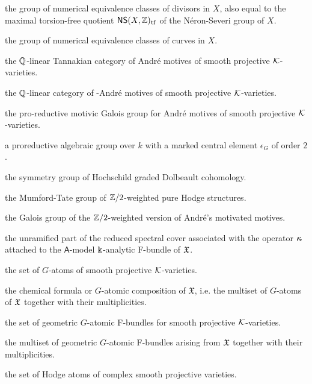 \documentclass[twoside,leqno]{article}
\numberwithin{equation}{section}
\theoremstyle{plain}
\theoremstyle{definition}
\begin{document}
\begin{description}[style=multiline, leftmargin=7.5em, labelwidth=7em, align=left, itemsep=0pt]
\item[$\mathsf{N}^{1}(X,\bbZ)$] the group of numerical equivalence classes of divisors in $X$, also equal to 
 the maximal torsion-free quotient $\mathsf{NS}(X,\mathbb Z)_{\operatorname{tf}}$ of the N\'{e}ron-Severi group of $X$. 
\item[$\mathsf{N}_{1}(X,\bbZ)$] the group of numerical equivalence classes of curves in $X$.
\item[$\CA{\kay}$] the $\mathbb Q$-linear Tannakian category of Andr\'{e} motives of smooth projective $\mathcal K$-varieties.
\item[$\CA{\kay}/\mathsf{Tate}$] the $\mathbb Q$-linear category of \nc-Andr\'{e} motives of smooth projective $\mathcal K$-varieties.
\item[$\GA{\kay}$] the pro-reductive motivic Galois group for Andr\'{e} motives of smooth projective $\mathcal K$-varieties.
\item[$(G,\epsilon_{G})$] a proreductive algebraic group over $k$ with a marked central element $\epsilon_{G}$ of order $2$.
\item[$(\HHgr,\epsilon_{\HHgr})$]  the symmetry group of Hochschild graded Dolbeault cohomology.
\item[$(\hodge,\epsilon_{\hodge})$]  the Mumford-Tate group of $\mathbb Z/2$-weighted pure Hodge structures. 
\item[$(\motM,\epsilon_{\motM})$] the Galois group of the $\mathbb Z/2$-weighted version of Andr\'{e}'s motivated motives.
\item[$\tU_{\fX}$] the unramified part of the reduced spectral cover associated with the operator $\boldsymbol{\kappa}$ attached to the $\mathsf{A}$-model $\Bbbk$-analytic F-bundle of $\mathfrak X$.
\item[$\Atoms_{G}^{\kay}$]  the set of $G$-atoms of smooth projective $\mathcal K$-varieties.
\item[$\CF_{G}(\mathfrak{X})$] the chemical formula or $G$-atomic composition of $\mathfrak{X}$, i.e. the multiset of $G$-atoms of $\mathfrak X$ together with their multiplicities.
\item[$\Atoms_{G}^{\kay,\mathsf{F}}$] the set of geometric $G$-atomic F-bundles for smooth projective $\mathcal K$-varieties.
\item[$\CF_{G}^{\mathsf{F}}(\mathfrak{X})$]  the multiset of geometric $G$-atomic F-bundles arising from $\mathfrak X$ together with their multiplicities.
\item[$\HAtoms$] the set of Hodge atoms of complex smooth projective varieties.
\end{description}
\end{document}
